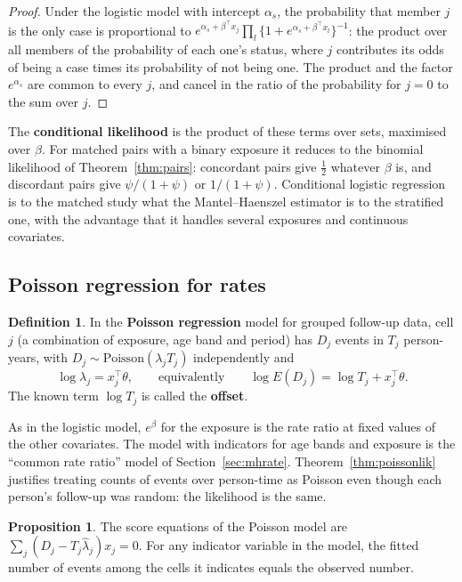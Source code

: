 \documentclass[11pt,a4paper]{article}
\numberwithin{equation}{section}
\theoremstyle{definition}
\newtheorem{defn}[thm]{Definition}
\newtheorem{prop}[thm]{Proposition}
\begin{document}
\begin{proof}
Under the logistic model with intercept $\alpha_s$, the probability that member $j$ is the only case is proportional to
$e^{\alpha_s + \beta^\top x_j}\prod_{l}\{1 + e^{\alpha_s + \beta^\top x_l}\}^{-1}$: the product over all members of the probability of each one's status, where $j$ contributes its odds of being a case
times its probability of not being one. The product and the factor $e^{\alpha_s}$ are common to every $j$, and cancel in the ratio of the probability for
$j = 0$ to the sum over $j$.
\end{proof}

The \textbf{conditional likelihood} is the product of these terms over sets, maximised over $\beta$. For matched pairs with a binary exposure it
reduces to the binomial likelihood of Theorem~\ref{thm:pairs}: concordant pairs give $\tfrac12$ whatever $\beta$ is, and discordant pairs give
$\psi/(1 + \psi)$ or $1/(1 + \psi)$. Conditional logistic regression is to the matched study what the Mantel--Haenszel estimator is to the stratified
one, with the advantage that it handles several exposures and continuous covariates.

\subsection{Poisson regression for rates}

\begin{defn}
In the \textbf{Poisson regression} model for grouped follow-up data, cell $j$ (a combination of exposure, age band and period) has $D_j$
events in $T_j$ person-years, with $D_j \sim \text{Poisson}(\lambda_j T_j)$ independently and
\[
\log\lambda_j = x_j^\top\theta, \qquad\text{equivalently}\qquad \log E(D_j) = \log T_j + x_j^\top\theta .
\]
The known term $\log T_j$ is called the \textbf{offset}.
\end{defn}

As in the logistic model, $e^\beta$ for the exposure is the rate ratio at fixed values of the other covariates. The model with indicators for
age bands and exposure is the ``common rate ratio'' model of Section~\ref{sec:mhrate}. Theorem~\ref{thm:poissonlik} justifies treating
counts of events over person-time as Poisson even though each person's follow-up was random: the likelihood is the same.

\begin{prop}
\label{prop:poisscore}
The score equations of the Poisson model are $\sum_j (D_j - T_j\hat\lambda_j)x_j = 0$. For any indicator variable in the model, the fitted number of events
among the cells it indicates equals the observed number.
\end{prop}
\end{document}
